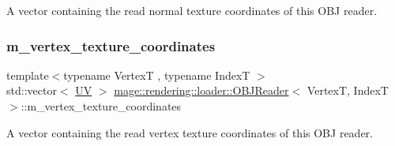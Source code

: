 A vector containing the read normal texture coordinates of this O\+BJ reader. \mbox{\label{classmage_1_1rendering_1_1loader_1_1_o_b_j_reader_aed919290e638cbe00a9144fdcb652178}} 
\subsubsection{\texorpdfstring{m\+\_\+vertex\+\_\+texture\+\_\+coordinates}{m\_vertex\_texture\_coordinates}}
{\footnotesize\ttfamily template$<$typename VertexT , typename IndexT $>$ \\
std\+::vector$<$ \mbox{\hyperlink{structmage_1_1_u_v}{UV}} $>$ \mbox{\hyperlink{classmage_1_1rendering_1_1loader_1_1_o_b_j_reader}{mage\+::rendering\+::loader\+::\+O\+B\+J\+Reader}}$<$ VertexT, IndexT $>$\+::m\+\_\+vertex\+\_\+texture\+\_\+coordinates\hspace{0.3cm}{\ttfamily [private]}}

A vector containing the read vertex texture coordinates of this O\+BJ reader. 